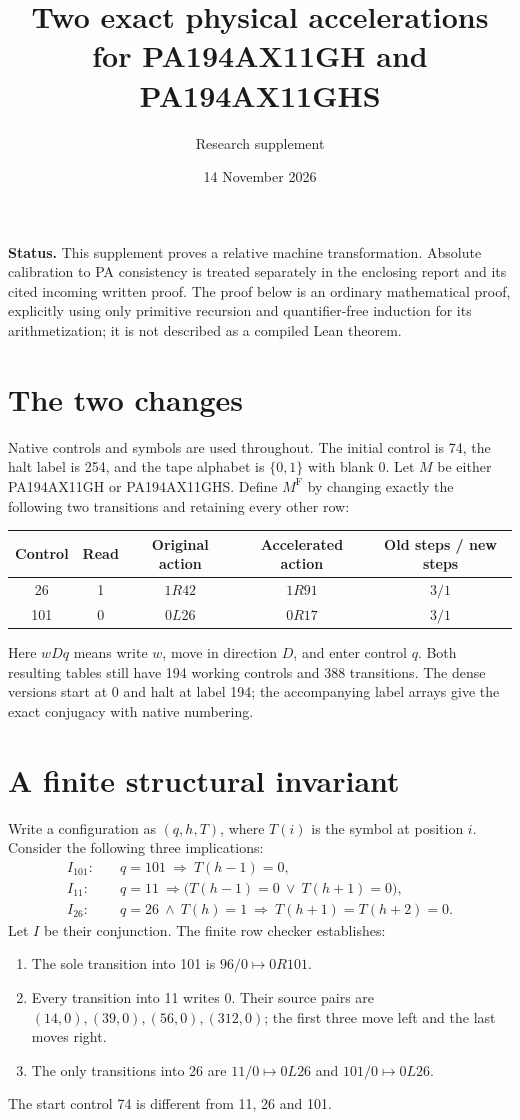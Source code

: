 \documentclass[11pt]{article}
\title{Two exact physical accelerations for PA194AX11GH and PA194AX11GHS}
\author{Research supplement}
\date{14 November 2026}
\begin{document}
\maketitle
\noindent\textbf{Status.} This supplement proves a relative machine transformation.
Absolute calibration to PA consistency is treated separately in the enclosing
report and its cited incoming written proof.
The proof below is an ordinary mathematical proof, explicitly using only
primitive recursion and quantifier-free induction for its arithmetization;
it is not described as a compiled Lean theorem.

\section{The two changes}
Native controls and symbols are used throughout. The initial control is 74,
the halt label is 254, and the tape alphabet is $\{0,1\}$ with blank 0.
Let $M$ be either PA194AX11GH or PA194AX11GHS. Define $M^{\mathrm F}$ by
changing exactly the following two transitions and retaining every other row:
\begin{center}
\begin{tabular}{ccccc}
\toprule
Control & Read & Original action & Accelerated action & Old steps / new steps\\
\midrule
26 & 1 & $1R42$ & $1R91$ & $3/1$\\
101 & 0 & $0L26$ & $0R17$ & $3/1$\\
\bottomrule
\end{tabular}
\end{center}
Here $wDq$ means write $w$, move in direction $D$, and enter control $q$.
Both resulting tables still have 194 working controls and 388 transitions.
The dense versions start at 0 and halt at label 194; the accompanying label
arrays give the exact conjugacy with native numbering.

\section{A finite structural invariant}
Write a configuration as $(q,h,T)$, where $T(i)$ is the symbol at position $i$.
Consider the following three implications:
\begin{align*}
I_{101}:\quad &q=101\ \Longrightarrow\ T(h-1)=0,\\
I_{11}:\quad &q=11\ \Longrightarrow\bigl(T(h-1)=0\ \lor\ T(h+1)=0\bigr),\\
I_{26}:\quad &q=26\ \land\ T(h)=1\ \Longrightarrow\ T(h+1)=T(h+2)=0.
\end{align*}
Let $I$ be their conjunction. The finite row checker establishes:
\begin{enumerate}
\item The sole transition into 101 is $96/0\mapsto0R101$.
\item Every transition into 11 writes 0. Their source pairs are
$(14,0),(39,0),(56,0),(312,0)$; the first three move left and the last moves right.
\item The only transitions into 26 are $11/0\mapsto0L26$ and
$101/0\mapsto0L26$.
\end{enumerate}
The start control 74 is different from 11, 26 and 101.
\end{document}
